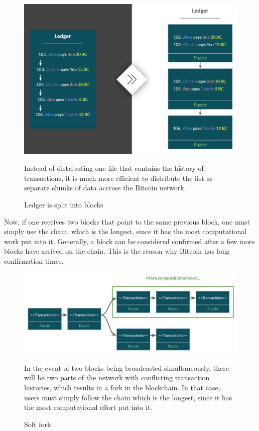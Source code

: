 \documentclass[a4paper, 12pt]{report}
\begin{document}
\begin{figure}[H]
	\includegraphics[width=\textwidth]{04_Ledger_Split}
	\caption{Ledger is split into blocks}
	\medskip
	\small Instead of distributing one file that contains the history of transactions, it is much more efficient to distribute the list as separate chunks of data accross the Bitcoin network.
	\label{fig:04_Ledger_Split}
\end{figure}

\par Now, if one receives two blocks that point to the same previous block, one must simply use the chain, which is the longest, since it has the most computational work put into it. Generally, a block can be considered confirmed after a few more blocks have arrived on the chain. This is the reason why Bitcoin has long confirmation times.

\begin{figure}[H]
	\includegraphics[width=\textwidth]{05_Soft_Fork}
	\caption{Soft fork}
	\medskip
	\small In the event of two blocks being broadcasted simultaneously, there will be two parts of the network with conflicting transaction histories, which results in a fork in the blockchain. In that case, users must simply follow the chain which is the longest, since it has the most computational effort put into it.
	\label{fig:05_Soft_Fork}
\end{figure}
\end{document}
